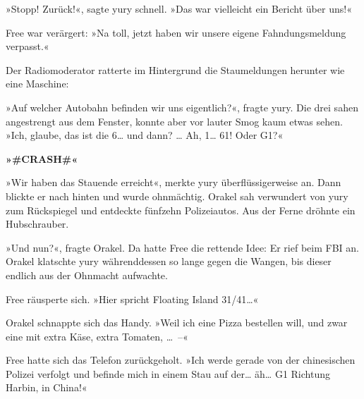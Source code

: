 
»Stopp! Zurück!«, sagte yury schnell. »Das war vielleicht ein Bericht über uns!«


Free war verärgert: »Na toll, jetzt haben wir unsere eigene Fahndungsmeldung verpasst.«

Der Radiomoderator ratterte im Hintergrund die Staumeldungen herunter wie eine Maschine:


»Auf welcher Autobahn befinden wir uns eigentlich?«, fragte yury. Die drei sahen angestrengt aus dem Fenster, konnte aber vor lauter Smog kaum etwas sehen. »Ich, glaube, das ist die 6… und dann? … Ah, 1… 61! Oder G1?«

\textbf{»\#CRASH\#«}

»Wir haben das Stauende erreicht«, merkte yury überflüssigerweise an. Dann blickte er nach hinten und wurde ohnmächtig. Orakel sah verwundert von yury zum Rückspiegel und entdeckte fünfzehn Polizeiautos. Aus der Ferne dröhnte ein Hubschrauber.

»Und nun?«, fragte Orakel. Da hatte Free die rettende Idee: Er rief beim FBI an. Orakel klatschte yury währenddessen so lange gegen die Wangen, bis dieser endlich aus der Ohnmacht aufwachte.


Free räusperte sich. »Hier spricht Floating Island 31/41…«


Orakel schnappte sich das Handy. »Weil ich eine Pizza bestellen will, und zwar eine mit extra Käse, extra Tomaten, …~–«


Free hatte sich das Telefon zurückgeholt. »Ich werde gerade von der chinesischen Polizei verfolgt und befinde mich in einem Stau auf der… äh… G1 Richtung Harbin, in China!«


